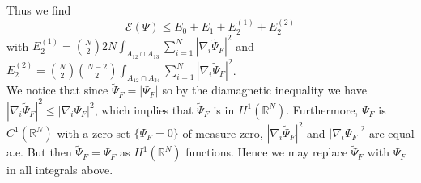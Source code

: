 \documentclass[a4paper,11pt]{article}
\newcommand{\abs}[1]{\left\lvert #1 \right\rvert}
\newcommand{\R}{\mathbb{R}}
\numberwithin{equation}{section}
\begin{document}
	Thus we find \begin{equation}
	\mathcal{E}(\Psi)\leq E_0+E_1+E_2^{(1)}+E_2^{(2)}
	\end{equation}
	with $ E_2^{(1)}=\binom{N}{2}2N\int_{A_{12}\cap A_{13}}\sum_{i=1}^{N}\abs{\nabla_i\tilde{\Psi}_F}^2 $ and $ E_2^{(2)}=\binom{N}{2}\binom{N-2}{2}\int_{A_{12}\cap A_{34}}\sum_{i=1}^{N}\abs{\nabla_i\tilde{\Psi}_F}^2 $.\\
	We notice that since $ \tilde{\Psi}_F=\abs{\Psi_F} $ so by the diamagnetic inequality we have $ \abs{\nabla_i\tilde{\Psi}_F}^2\leq \abs{\nabla_i\Psi_F}^2 $, which implies that $ \tilde{\Psi}_F $ is in $ H^{1}(\R^N) $. Furthermore, $ \Psi_F $ is $ C^{1}(\R^N) $ with a zero set $ \{\Psi_F=0\} $ of measure zero, $ \abs{\nabla_i\tilde{\Psi}_F}^2 $ and $ \abs{\nabla_i\Psi_F}^2 $ are equal a.e. But then $ \tilde{\Psi}_F=\Psi_F $ as $ H^{1}(\R^N) $ functions. Hence we may replace $ \tilde{\Psi}_F $ with $ \Psi_F $ in all integrals above.
	
\end{document}
